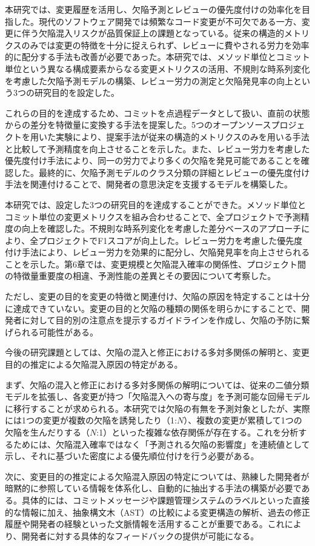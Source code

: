 本研究では、変更履歴を活用し、欠陥予測とレビューの優先度付けの効率化を目指した。現代のソフトウェア開発では頻繁なコード変更が不可欠である一方、変更に伴う欠陥混入リスクが品質保証上の課題となっている。従来の構造的メトリクスのみでは変更の特徴を十分に捉えられず、レビューに費やされる労力を効率的に配分する手法も改善が必要であった。本研究では、メソッド単位とコミット単位という異なる構成要素からなる変更メトリクスの活用、不規則な時系列変化を考慮した欠陥予測モデルの構築、レビュー労力の測定と欠陥発見率の向上という3つの研究目的を設定した。

これらの目的を達成するため、コミットを点過程データとして扱い、直前の状態からの差分を特徴量に変換する手法を提案した。5つのオープンソースプロジェクトを用いた実験により、提案手法が従来の構造的メトリクスのみを用いる手法と比較して予測精度を向上させることを示した。また、レビュー労力を考慮した優先度付け手法により、同一の労力でより多くの欠陥を発見可能であることを確認した。最終的に、欠陥予測モデルのクラス分類の詳細とレビューの優先度付け手法を関連付けることで、開発者の意思決定を支援するモデルを構築した。

本研究では、設定した3つの研究目的を達成することができた。メソッド単位とコミット単位の変更メトリクスを組み合わせることで、全プロジェクトで予測精度の向上を確認した。不規則な時系列変化を考慮した差分ベースのアプローチにより、全プロジェクトでF1スコアが向上した。レビュー労力を考慮した優先度付け手法により、レビュー労力を効果的に配分し、欠陥発見率を向上させられることを示した。第6章では、変更規模と欠陥混入確率の関係性、プロジェクト間の特徴量重要度の相違、予測性能の差異とその要因について考察した。

ただし、変更の目的を変更の特徴と関連付け、欠陥の原因を特定することは十分に達成できていない。変更の目的と欠陥の種類の関係を明らかにすることで、開発者に対して目的別の注意点を提示するガイドラインを作成し、欠陥の予防に繋げられる可能性がある。

今後の研究課題としては、欠陥の混入と修正における多対多関係の解明と、変更目的の推定による欠陥混入原因の特定がある。

まず、欠陥の混入と修正における多対多関係の解明については、従来の二値分類モデルを拡張し、各変更が持つ「欠陥混入への寄与度」を予測可能な回帰モデルに移行することが求められる。本研究では欠陥の有無を予測対象としたが、実際には1つの変更が複数の欠陥を誘発したり（1:$N$）、複数の変更が累積して1つの欠陥を生んだりする（$N$:1）といった複雑な依存関係が存在する。これを分析するためには、欠陥混入確率ではなく「予測される欠陥の影響度」を連続値として示し、それに基づいた密度による優先順位付けを行う必要がある。

次に、変更目的の推定による欠陥混入原因の特定については、熟練した開発者が暗黙的に参照している情報を体系化し、自動的に抽出する手法の構築が必要である。具体的には、コミットメッセージや課題管理システムのラベルといった直接的な情報に加え、抽象構文木（AST）の比較による変更構造の解析、過去の修正履歴や開発者の経験といった文脈情報を活用することが重要である。これにより、開発者に対する具体的なフィードバックの提供が可能になる。